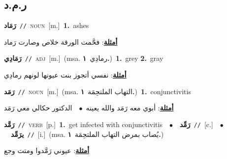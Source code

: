 \documentclass[10pt,a4paper,twoside]{article} %
\begin{document}
\begin{multicols}{2}
\vspace{-3mm}
\subsection*{\color{blue}\foreignlanguage{arabic}{ر.م.د}\color{blue}{}} 

{\setlength\topsep{0pt}\textbf{\foreignlanguage{arabic}{رَمَاد}}\ {\color{gray}\texttt{//}\color{black}}\ \textsc{noun}\ [m.]\ \textbf{1.}~ashes\  \begin{flushright}\color{gray}\foreignlanguage{arabic}{\textbf{\underline{\foreignlanguage{arabic}{أمثلة}}}: فحَّمت الورقة خلاص وصارت رَماد}\end{flushright}\color{black}} \vspace{2mm}

{\setlength\topsep{0pt}\textbf{\foreignlanguage{arabic}{رَمَادِي}}\ {\color{gray}\texttt{//}\color{black}}\ \textsc{adj}\ [m.]\ \color{gray}(msa. \foreignlanguage{arabic}{رمادِي}~\foreignlanguage{arabic}{\textbf{١.}})\color{black}\ \textbf{1.}~grey  \textbf{2.}~gray\  \begin{flushright}\color{gray}\foreignlanguage{arabic}{\textbf{\underline{\foreignlanguage{arabic}{أمثلة}}}: نفسي أتجوز بنت عيونها لونهم رمادِي}\end{flushright}\color{black}} \vspace{2mm}

{\setlength\topsep{0pt}\textbf{\foreignlanguage{arabic}{رَمَد}}\ {\color{gray}\texttt{//}\color{black}}\ \textsc{noun}\ [m.]\ \color{gray}(msa. \foreignlanguage{arabic}{التهاب الملتحِمَة}~\foreignlanguage{arabic}{\textbf{١.}})\color{black}\ \textbf{1.}~conjunctivitis\  \begin{flushright}\color{gray}\foreignlanguage{arabic}{\textbf{\underline{\foreignlanguage{arabic}{أمثلة}}}: أبوي معه رَمَد والله يعينه\ $\bullet$\ \  الدكتور حكالي معي رَمَد}\end{flushright}\color{black}} \vspace{2mm}

{\setlength\topsep{0pt}\textbf{\foreignlanguage{arabic}{رَمَّد}}\ {\color{gray}\texttt{//}\color{black}}\ \textsc{verb}\ [p.]\ \textbf{1.}~get infected with conjunctivitis\ \ $\bullet$\ \ \setlength\topsep{0pt}\textbf{\foreignlanguage{arabic}{رَمِّد}}\ {\color{gray}\texttt{//}\color{black}}\ [c.]\ \ $\bullet$\ \ \setlength\topsep{0pt}\textbf{\foreignlanguage{arabic}{يرَمِّد}}\ {\color{gray}\texttt{//}\color{black}}\ [i.]\ \color{gray}(msa. \foreignlanguage{arabic}{يُصاب بمرض التهاب الملتحِمَة}~\foreignlanguage{arabic}{\textbf{١.}})\color{black}\  \begin{flushright}\color{gray}\foreignlanguage{arabic}{\textbf{\underline{\foreignlanguage{arabic}{أمثلة}}}: عيوني رَمَّدوا ومتت وجع}\end{flushright}\color{black}} \vspace{2mm}


\end{multicols}
\end{document}
